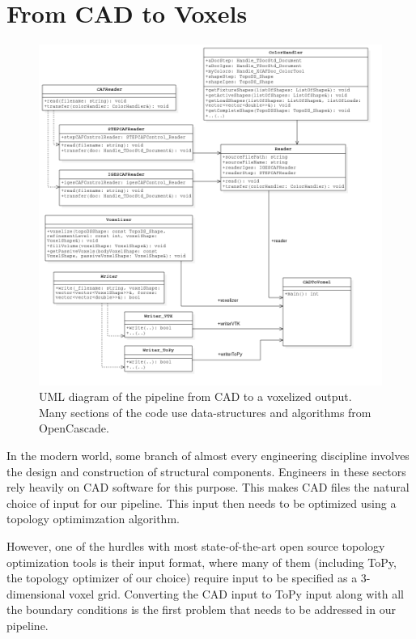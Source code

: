 \section{From \acs{CAD} to Voxels}
\label{sec: CADToVoxels}

\begin{figure}
  \includegraphics[scale=0.5]{Pictures/CADToVoxel/UML_Complete_PNG.png}
\caption{UML diagram of the pipeline from CAD to a voxelized output. Many sections of the code use data-structures and algorithms from OpenCascade\cite{OpenCascade}.}
\label{fig: umlCADToVoxel}
\end{figure}

In the modern world, some branch of almost every engineering discipline involves the design and construction of structural components. Engineers in these sectors rely heavily on CAD software for this purpose. This makes CAD files the natural choice of input for our pipeline. This input then needs to be optimized using a topology optimimzation algorithm.

However, one of the hurdles with most state-of-the-art open source topology optimization tools is their input format, where many of them (including ToPy, the topology optimizer of our choice) require input to be specified as a 3-dimensional voxel grid. Converting the CAD input to ToPy input along with all the boundary conditions is the first problem that needs to be addressed in our pipeline.

